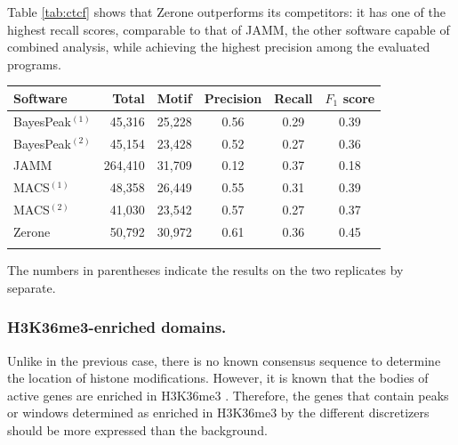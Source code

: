 \documentclass{bioinfo}
\begin{document}
Table \ref{tab:ctcf} shows that Zerone outperforms its competitors: it has one
of the highest recall scores, comparable to that of JAMM, the other software
capable of combined analysis, while achieving the highest precision among the
evaluated programs.

\begin{table}[!t]
{\begin{tabular}{lrrccc}
        \toprule
        \textbf{Software}  & \textbf{Total}  & \textbf{Motif} &
        \textbf{Precision} & \textbf{Recall} & \textbf{$F_{1}$ score} \\
        \midrule
        BayesPeak$^{(1)}$ &  45,316 & 25,228 & 0.56 & 0.29 & 0.39 \\
        BayesPeak$^{(2)}$ &  45,154 & 23,428 & 0.52 & 0.27 & 0.36 \\
        JAMM              & 264,410 & 31,709 & 0.12 & 0.37 & 0.18 \\
        MACS$^{(1)}$      &  48,358 & 26,449 & 0.55 & 0.31 & 0.39 \\
        MACS$^{(2)}$      &  41,030 & 23,542 & 0.57 & 0.27 & 0.37 \\
        Zerone            &  50,792 & 30,972 & 0.61 & 0.36 & 0.45 \\
        \botrule
\end{tabular}}{The numbers in parentheses indicate the results on the two
replicates by separate.}
\end{table}

\subsubsection{H3K36me3-enriched domains.}
Unlike in the previous case, there is no known consensus sequence to determine
the location of histone modifications. However, it is known that the bodies of
active genes are enriched in H3K36me3 \citep{pmid16122420,pmid23739122}.
Therefore, the genes that contain peaks or windows determined as enriched in
H3K36me3 by the different discretizers should be more expressed than the
background.
\end{document}
